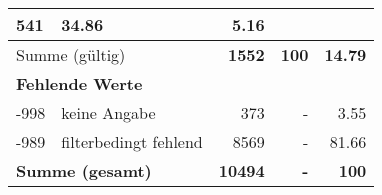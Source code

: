 \begin{longtable}{lXrrr}
       \num{541} &
       \num[round-mode=places,round-precision=2]{34,86} &
         \num[round-mode=places,round-precision=2]{5,16} \\
     \midrule
     \multicolumn{2}{l}{Summe (gültig)} &
       \textbf{\num{1552}} &
     \textbf{100} &
       \textbf{\num[round-mode=places,round-precision=2]{14,79}} \\
     \multicolumn{5}{l}{\textbf{Fehlende Werte}}\\
       -998 &
       keine Angabe &
         \num{373} &
        - &
         \num[round-mode=places,round-precision=2]{3,55} \\
       -989 &
       filterbedingt fehlend &
         \num{8569} &
        - &
         \num[round-mode=places,round-precision=2]{81,66} \\
     \midrule
     \multicolumn{2}{l}{\textbf{Summe (gesamt)}} &
          \textbf{\num{10494}} &
        \textbf{-} &
        \textbf{100} \\
     \bottomrule
     \end{longtable}
     
